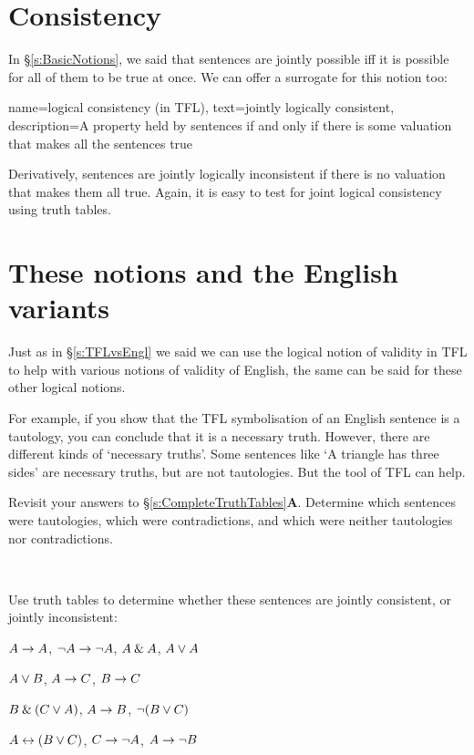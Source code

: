 \section{Consistency}
In \S\ref{s:BasicNotions}, we said that sentences are jointly possible iff it is possible for all of them to be true at once. We can offer a surrogate for this notion too:

{
  name=logical consistency (in TFL),
  text=jointly logically consistent,
description={A property held by sentences if and only if there is some \gls{valuation} that makes all the sentences true}
}

Derivatively, sentences are jointly logically inconsistent if there is no valuation that makes them all true. Again, it is easy to test for joint logical consistency using truth tables.

\section{These notions and the English variants}
Just as in \S\ref{s:TFLvsEngl} we said we can use the logical notion of validity in TFL to help with various notions of validity of English, the same can  be said for these other logical notions.

For example, if you show that the TFL symbolisation of an English sentence is a tautology, you can conclude that it is a necessary truth. However, there are different kinds of `necessary truths'. Some sentences like `A triangle has three sides' are necessary truths, but are not tautologies. But the tool of TFL can help.


\practiceproblems
\problempart
Revisit your answers to \S\ref{s:CompleteTruthTables}\textbf{A}. Determine which sentences were tautologies, which were contradictions, and which were neither tautologies nor contradictions.
\solutions

\

\problempart
\label{pr.TT.consistent}
Use truth tables to determine whether these sentences are jointly consistent, or jointly inconsistent:
\begin{earg}
\item $A\rightarrow A$, $\neg A \rightarrow \neg A$, $A\mathbin{\&} A$, $A\vee A$ %
\item $A\vee B$, $A\rightarrow C$, $B\rightarrow C$ %
\item $B\mathbin{\&}(C\vee A)$, $A\rightarrow B$, $\neg(B\vee C)$  %
\item $A\leftrightarrow(B\vee C)$, $C\rightarrow \neg A$, $A\rightarrow \neg B$ %
\end{earg}



